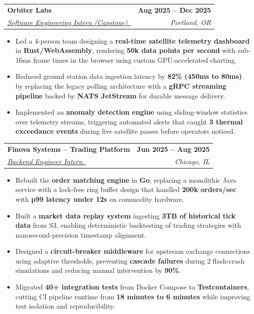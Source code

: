 \documentclass[a4,10pt]{article}
\makeatletter
\newcommand{\resumeItem}[1]{
  \item\small{\justifying #1 \vspace{-2pt}}
}
\newcommand{\resumeSubheading}[4]{
  \vspace{-2pt}\item
    \begin{tabular*}{1.0\textwidth}[t]{l@{\extracolsep{\fill}}r}
      \textbf{#1} & \textbf{\small #2} \\
      \textit{\small#3} & \textit{\small #4} \\
    \end{tabular*}\vspace{-6pt}
}
\newcommand{\resumeItemListStart}{\begin{itemize}}
\newcommand{\resumeItemListEnd}{\end{itemize}\vspace{-5pt}}
\makeatother
\begin{document}
    \resumeSubheading
   {Orbiter Labs}{Aug 2025 -- Dec 2025}
   {\href{https://morganchen.dev/view/orbiter/}{Software Engineering Intern (Capstone)~\scalebox{0.8}{\faLink}}}{Portland, OR}
   \resumeItemListStart
        \resumeItem{Led a 4-person team designing a \textbf{real-time satellite telemetry dashboard} in \textbf{Rust/WebAssembly}, rendering \textbf{50k data points per second} with sub-16ms frame times in the browser using custom GPU-accelerated charting.}
        \resumeItem{Reduced ground station data ingestion latency by \textbf{82\% (450ms to 80ms)} by replacing the legacy polling architecture with a \textbf{gRPC streaming pipeline} backed by \textbf{NATS JetStream} for durable message delivery.}
        \resumeItem{Implemented an \textbf{anomaly detection engine} using sliding-window statistics over telemetry streams, triggering automated alerts that caught \textbf{3 thermal exceedance events} during live satellite passes before operators noticed.}
   \resumeItemListEnd
   
    \resumeSubheading
   {Finova Systems -- Trading Platform}{Jun 2025 -- Aug 2025}
   {\href{https://morganchen.dev/view/finova/}{Backend Engineer Intern~\scalebox{0.8}{\faLink}}}{Chicago, IL}
   \resumeItemListStart
     \resumeItem{Rebuilt the \textbf{order matching engine} in \textbf{Go}, replacing a monolithic Java service with a lock-free ring buffer design that handled \textbf{200k orders/sec} with \textbf{p99 latency under 12\textmu s} on commodity hardware.}
     \resumeItem{Built a \textbf{market data replay system} ingesting \textbf{3TB of historical tick data} from S3, enabling deterministic backtesting of trading strategies with nanosecond-precision timestamp alignment.}
     \resumeItem{Designed a \textbf{circuit-breaker middleware} for upstream exchange connections using adaptive thresholds, preventing \textbf{cascade failures} during 2 flash-crash simulations and reducing manual intervention by \textbf{90\%}.}
     \resumeItem{Migrated \textbf{40+ integration tests} from Docker Compose to \textbf{Testcontainers}, cutting CI pipeline runtime from \textbf{18 minutes to 6 minutes} while improving test isolation and reproducibility.}
   \resumeItemListEnd
\end{document}
